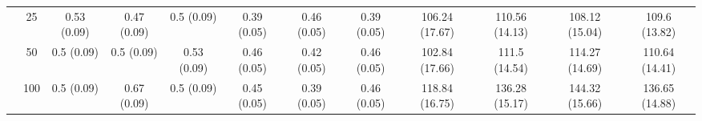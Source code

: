 \documentclass[11pt]{article}
\theoremstyle{definition}
\begin{document}
\begin{table}[H]
\begin{center}
{\begin{tabular}{cc|ccc|ccc|cccc|}
    & 25  & 0.53 (0.09) & 0.47 (0.09) & 0.5 (0.09) & 0.39 (0.05) & 0.46 (0.05) & 0.39 (0.05) & 106.24 (17.67) & 110.56 (14.13) & 108.12 (15.04) & 109.6 (13.82) \\ 
    & 50  & 0.5 (0.09) & 0.5 (0.09) & 0.53 (0.09) & 0.46 (0.05) & 0.42 (0.05) & 0.46 (0.05) & 102.84 (17.66) & 111.5 (14.54) & 114.27 (14.69) & 110.64 (14.41) \\ 
    & 100  & 0.5 (0.09) & 0.67 (0.09) & 0.5 (0.09) & 0.45 (0.05) & 0.39 (0.05) & 0.46 (0.05) & 118.84 (16.75) & 136.28 (15.17) & 144.32 (15.66) & 136.65 (14.88) \\
\end{tabular}}
   \end{center}
      \vspace{-.5cm}
\end{table}






\end{document}
